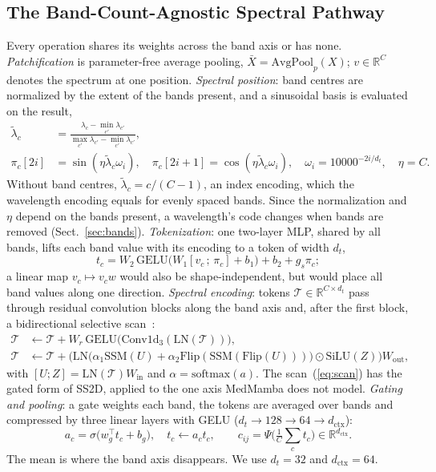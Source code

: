 \documentclass{svproc}
\begin{document}
\subsection{The Band-Count-Agnostic Spectral Pathway}\label{sec:pathway}
Every operation shares its weights across the band axis or has none. \emph{Patchification} is parameter-free average pooling, $\bar{X} = \mathrm{AvgPool}_p(X)$; $v \in \mathbb{R}^C$ denotes the spectrum at one position. \emph{Spectral position}: band centres are normalized by the extent of the bands present, and a sinusoidal basis is evaluated on the result,
\begin{align}
\tilde{\lambda}_c &= \frac{\lambda_c - \min_{c'} \lambda_{c'}}{\max_{c'} \lambda_{c'} - \min_{c'} \lambda_{c'}}, \nonumber\\
\pi_c[2i] &= \sin(\eta \tilde{\lambda}_c \omega_i),\quad \pi_c[2i{+}1] = \cos(\eta \tilde{\lambda}_c \omega_i),\quad \omega_i = 10000^{-2i/d_t},\quad \eta = C.
\label{eq:pos}
\end{align}
Without band centres, $\tilde{\lambda}_c = c/(C-1)$, an index encoding, which the wavelength encoding equals for evenly spaced bands. Since the normalization and $\eta$ depend on the bands present, a wavelength's code changes when bands are removed (Sect.~\ref{sec:bands}). \emph{Tokenization}: one two-layer MLP, shared by all bands, lifts each band value with its encoding to a token of width $d_t$,
\begin{equation}
t_c = W_2\, \mathrm{GELU}\big(W_1 [v_c \,;\, \pi_c] + b_1\big) + b_2 + g_s \pi_c;
\label{eq:tok}
\end{equation}
a linear map $v_c \mapsto v_c w$ would also be shape-independent, but would place all band values along one direction. \emph{Spectral encoding}: tokens $\mathcal{T} \in \mathbb{R}^{C \times d_t}$ pass through residual convolution blocks along the band axis and, after the first block, a bidirectional selective scan~\cite{mamba}:
\begin{align}
\mathcal{T} &\leftarrow \mathcal{T} + W_r\, \mathrm{GELU}\big(\mathrm{Conv1d}_3(\mathrm{LN}(\mathcal{T}))\big), \label{eq:conv1d}\\
\mathcal{T} &\leftarrow \mathcal{T} + \Big(\mathrm{LN}\big(\alpha_1 \mathrm{SSM}(U) + \alpha_2 \mathrm{Flip}(\mathrm{SSM}(\mathrm{Flip}(U)))\big) \odot \mathrm{SiLU}(Z)\Big) W_{\text{out}}, \label{eq:scan}
\end{align}
with $[U;Z] = \mathrm{LN}(\mathcal{T})W_{\text{in}}$ and $\alpha = \mathrm{softmax}(a)$. The scan~(\ref{eq:scan}) has the gated form of SS2D, applied to the one axis MedMamba does not model. \emph{Gating and pooling}: a gate weights each band, the tokens are averaged over bands and compressed by three linear layers with GELU ($d_t \to 128 \to 64 \to d_{\text{ctx}}$):
\begin{equation}
a_c = \sigma\big(w_g^{\top} t_c + b_g\big), \quad t_c \leftarrow a_c t_c, \qquad c_{ij} = \Psi\Big(\tfrac{1}{C}\textstyle\sum_{c} t_c\Big) \in \mathbb{R}^{d_{\text{ctx}}}.
\label{eq:pool}
\end{equation}
The mean is where the band axis disappears. We use $d_t = 32$ and $d_{\text{ctx}} = 64$.
\end{document}
